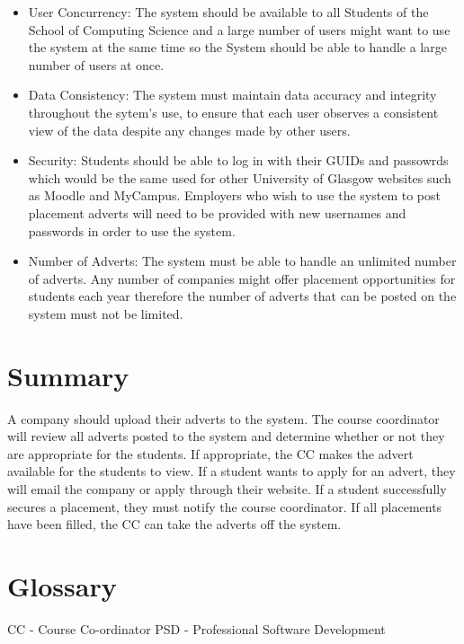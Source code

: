 \documentclass{l3deliverable}
\begin{document}
\begin{itemize}
\item User Concurrency: The system should be available to all Students of the School of Computing Science and a large number of users might want to use the system at the same time so the System should be able to handle a large number of users at once.
\item Data Consistency: The system must maintain data accuracy and integrity throughout the sytem's use, to ensure that each user observes a consistent view of the data despite any changes made by other users.
\item Security: Students should be able to log in with their GUIDs and passowrds which would be the same used for other University of Glasgow websites such as Moodle and MyCampus. Employers who wish to use the system to post placement adverts will need to be provided with new usernames and passwords in order to use the system.
\item Number of Adverts: The system must be able to handle an unlimited number of adverts. Any number of companies might offer placement opportunities for students each year therefore the number of adverts that can be posted on the system must not be limited.
\end{itemize}

\section{Summary}

A company should upload their adverts to the system. The course coordinator will review
all adverts posted to the system and determine whether or not they are appropriate for the
students. If appropriate, the CC makes the advert available for the students to view. If a student
wants to apply for an advert, they will email the company or apply through their website. If
a student successfully secures a placement, they must notify the course coordinator. If all
placements have been filled, the CC can take the adverts off the system.

\appendix

\section{Glossary}
CC - Course Co-ordinator
PSD - Professional Software Development
\end{document}
